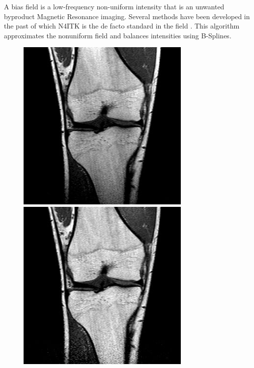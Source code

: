 A bias field is a low-frequency non-uniform intensity that is an unwanted byproduct Magnetic Resonance imaging. Several methods have been developed in the past of which N4ITK is the de facto standard in the field \cite{Tustison2010}. This algorithm approximates the nonuniform field and balances intensities using B-Splines. 

\begin{figure}[H]
  \includegraphics[width=\linewidth]{imgs/orig.jpg}
\endminipage\hfill
{}
  \includegraphics[width=\linewidth]{imgs/corr.jpg}

\end{figure}
